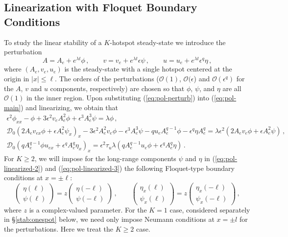 \documentclass{article}%
\newcommand{\bsub}{\begin{subequations}}
\newcommand{\esub}{\end{subequations}$\!$}
\begin{document}
\subsection{Linearization with Floquet Boundary Conditions}

To study the linear stability of a $K$-hotspot steady-state we
introduce the perturbation 
\begin{equation}
A=A_{e}+e^{\lambda t}\phi \,,\qquad v=v_{e}+e^{\lambda t}\epsilon\psi\,,
\qquad u=u_{e}+e^{\lambda t}\epsilon^{q}\eta\,, \label{eq:pol-perturb}
\end{equation}
where $(A_{e},v_{e},u_{e})$ is the steady-state with a single hotspot
centered at the origin in $|x|\leq \ell$.  The orders of the
perturbations (${\mathcal O}(1)$, ${\mathcal O}(\epsilon$) and
${\mathcal O}(\epsilon^{q})$ for the $A$, $v$ and $u$ components,
respectively) are chosen so that $\phi$, $\psi$, and $\eta$ are all
${\mathcal O}(1)$ in the inner region.  Upon substituting
(\ref{eq:pol-perturb}) into (\ref{eq:pol-main}) and linearizing, we
obtain that 
\bsub\label{eq:pol-linearized}
\begin{gather}
\epsilon^{2}\phi_{xx}-\phi+3\epsilon^{2}v_{e}A_{e}^{2}\phi+
\epsilon^{3}A_{e}^{3}\psi  =\lambda\phi\,, \label{eq:pol-linearized-1}\\ 
{\mathcal D}_{0}\left(2A_{e}v_{ex}\phi+\epsilon A_{e}^{2}\psi_{x}\right)_{x} 
-3\epsilon^{2}A_{e}^{2}v_{e}\phi-\epsilon^{3}A_{e}^{3}\psi 
-qu_{e}A_{e}^{q-1}\phi-\epsilon^{q}\eta A_{e}^{q} 
=\lambda\epsilon^{2}\left(2A_{e}v_{e}\phi+\epsilon
A_{e}^{2}\psi\right)\,, \label{eq:pol-linearized-2}\\ 
{\mathcal D}_{0}\left(qA_{e}^{q-1}\phi u_{ex}+\epsilon^{q}A_{e}^{q}\eta_{x}
\right)_{x} 
=\epsilon^{2}\tau_{u}\lambda\left(qA_{e}^{q-1}u_{e}\phi+\epsilon^{q}
A_{e}^{q}\eta\right)\,.
\label{eq:pol-linearized-3}
\end{gather}
\esub For $K\geq 2$, we will impose for the long-range components
$\psi$ and $\eta$ in (\ref{eq:pol-linearized-2}) and
(\ref{eq:pol-linearized-3}) the following Floquet-type boundary
conditions at $x=\pm\ell$:
\begin{equation}
\left(\begin{array}{c}
\eta(\ell)\\
\psi(\ell)
\end{array}\right)=z\left(\begin{array}{c}
\eta(-\ell)\\
\psi(-\ell)
\end{array}\right)\,, \qquad\left(\begin{array}{c}
\eta_x(\ell)\\
\psi_x(\ell)
\end{array}\right)=z\left(\begin{array}{c}
\eta_{x}(-\ell)\\
\psi_{x}(-\ell)
\end{array}\right)\,,\label{eq:pol-floquet-bc}
\end{equation}
where $z$ is a complex-valued parameter.   For the $K=1$ case,
considered separately in \S \ref{stab:onespot} below, we need only
impose Neumann conditions at $x=\pm l$ for the perturbations. Here we
treat the $K\geq 2$ case.
\end{document}
